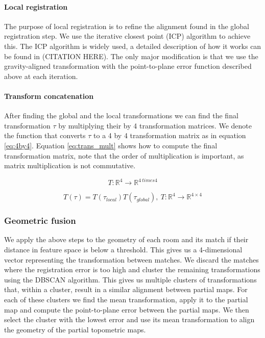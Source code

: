 \paragraph{Local registration}
The purpose of local registration is to refine the alignment found in the global registration step. We use the iterative closest point (ICP) algorithm to achieve this. The ICP algorithm is widely used, a detailed description of how it works can be found in (CITATION HERE). The only major modification is that we use the gravity-aligned transformation with the point-to-plane error function described above at each iteration.


\paragraph{Transform concatenation}
After finding the global and the local transformations we can find the final transformation \(\tau\) by multiplying their by 4 transformation matrices. We denote the function that converts \(\tau\) to a 4 by 4 transformation matrix as in equation \ref{eq:4by4}. Equation \ref{eq:trans_mult} shows how to compute the final transformation matrix, note that the order of multiplication is important, as matrix multiplication is not commutative.

\begin{equation}
    \label{eq:4by4}
    T: \mathbb{R}^4 \rightarrow \mathbb{R}^{4 \ times 4}
\end{equation}

\begin{equation}
    \label{eq:trans_mult}
    T(\tau) = T(\tau_{local})T(\tau_{global}),\ T: \mathbb{R}^4 \rightarrow \mathbb{R}^{4 \times 4}
\end{equation}

\subsubsection{Geometric fusion}
We apply the above steps to the geometry of each room and its match if their distance in feature space is below a threshold. This gives us a 4-dimensional vector representing the transformation between matches. We discard the matches where the registration error is too high and cluster the remaining transformations using the DBSCAN algorithm. This gives us multiple clusters of transformations that, within a cluster, result in a similar alignment between partial maps. For each of these clusters we find the mean transformation, apply it to the partial map and compute the point-to-plane error between the partial maps. We then select the cluster with the lowest error and use its mean transformation to align the geometry of the partial topometric maps. 


